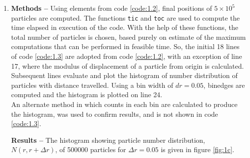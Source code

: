 \documentclass[a4paper]{article}
\begin{document}
\begin{enumerate} [label*=\textbf{(\alph*)}]
				\subitem \textbf{Results --} 
					A scatter plot of final positions after 2000 time steps, of 2000 particles undergoing two dimensional random walk is shown in figure \ref{fig:1b}. 
				
			
			
			\item 
				\subitem \textbf{Methods  --} 
					Using elements from code \ref{code:1.2}, final positions of \(5 \times 10^{5}\) particles are computed. The functions \texttt{tic} and \texttt{toc} are used to compute the time elapsed in execution of the code. With the help of these functions, the total number of particles is chosen, based purely on estimate of the maximum computations that can be performed in feasible time. So, the initial 18 lines of code \ref{code:1.3} are  adopted from code \ref{code:1.2}, with an exception of line 17, where the modulus of displacement of a particle from origin is calculated. Subsequent lines evaluate and plot the histogram of number distribution of particles with distance travelled. Using a bin width of \(dr=0.05\), binedges are computed and the histogram is plotted on line 24.\\
					An alternate method in which counts in each bin are calculated to produce the histogram, was used to confirm results, and is not shown in code \ref{code:1.3}. 
					
					\begin{figure} [h]
						
					\end{figure}
					
				\subitem \textbf{Results --}
					The histogram showing particle number distribution, \(N(r,r+\Delta r)\), of 500000 particles for \(\Delta r = 0.05\) is given in figure \ref{fig:1c}. 
				
				
			

\end{enumerate}
\end{document}
